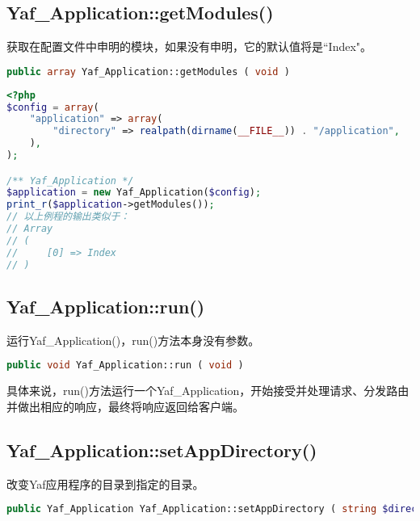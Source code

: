 \subsection{Yaf\_Application::getModules()}

获取在配置文件中申明的模块，如果没有申明，它的默认值将是``Index"。





\begin{lstlisting}[language=PHP]
public array Yaf_Application::getModules ( void )
\end{lstlisting}

\begin{lstlisting}[language=PHP]
<?php
$config = array(
    "application" => array(
        "directory" => realpath(dirname(__FILE__)) . "/application",
    ),
);

/** Yaf_Application */
$application = new Yaf_Application($config);
print_r($application->getModules());
// 以上例程的输出类似于：
// Array
// (
//     [0] => Index
// )
\end{lstlisting}


\subsection{Yaf\_Application::run()}

运行Yaf\_Application()，run()方法本身没有参数。





\begin{lstlisting}[language=PHP]
public void Yaf_Application::run ( void )
\end{lstlisting}

具体来说，run()方法运行一个Yaf\_Application，开始接受并处理请求、分发路由并做出相应的响应，最终将响应返回给客户端。




\subsection{Yaf\_Application::setAppDirectory()}

改变Yaf应用程序的目录到指定的目录。






\begin{lstlisting}[language=PHP]
public Yaf_Application Yaf_Application::setAppDirectory ( string $directory )
\end{lstlisting}




